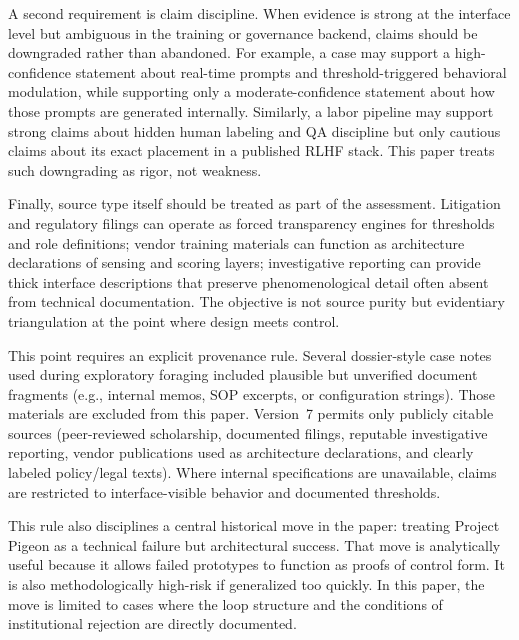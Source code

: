 \documentclass[runningheads]{llncs}
\begin{document}
A second requirement is claim discipline. When evidence is strong at the interface level but ambiguous in the training or governance backend, claims should be downgraded rather than abandoned. For example, a case may support a high-confidence statement about real-time prompts and threshold-triggered behavioral modulation, while supporting only a moderate-confidence statement about how those prompts are generated internally. Similarly, a labor pipeline may support strong claims about hidden human labeling and QA discipline but only cautious claims about its exact placement in a published RLHF stack. This paper treats such downgrading as rigor, not weakness.

Finally, source type itself should be treated as part of the assessment. Litigation and regulatory filings can operate as forced transparency engines for thresholds and role definitions; vendor training materials can function as architecture declarations of sensing and scoring layers; investigative reporting can provide thick interface descriptions that preserve phenomenological detail often absent from technical documentation. The objective is not source purity but evidentiary triangulation at the point where design meets control.

This point requires an explicit provenance rule. Several dossier-style case notes used during exploratory foraging included plausible but unverified document fragments (e.g., internal memos, SOP excerpts, or configuration strings). Those materials are excluded from this paper. Version~7 permits only publicly citable sources (peer-reviewed scholarship, documented filings, reputable investigative reporting, vendor publications used as architecture declarations, and clearly labeled policy/legal texts). Where internal specifications are unavailable, claims are restricted to interface-visible behavior and documented thresholds.

This rule also disciplines a central historical move in the paper: treating Project Pigeon as a technical failure but architectural success. That move is analytically useful because it allows failed prototypes to function as proofs of control form. It is also methodologically high-risk if generalized too quickly. In this paper, the move is limited to cases where the loop structure and the conditions of institutional rejection are directly documented.
\end{document}
